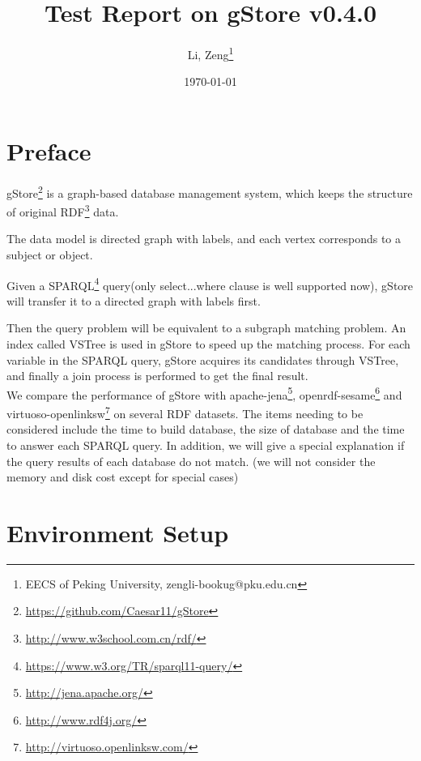 \documentclass[titlepage, a4paper, 12pt] {article}
\begin{document}
\title{\textbf{Test Report on gStore v0.4.0}}
\author{Li, Zeng\footnote{EECS of Peking University, zengli-bookug@pku.edu.cn}}
\date{\today}
\maketitle

\setcounter{tocdepth}{3}
\tableofcontents
\clearpage

\section{Preface}

gStore\footnote{\href{https://github.com/Caesar11/gStore}{https://github.com/Caesar11/gStore}} is a graph-based database management system, which keeps the structure of original RDF\footnote{\href{http://www.w3school.com.cn/rdf/}{http://www.w3school.com.cn/rdf/}} data. 

The data model is directed graph with labels, and each vertex corresponds to a subject or object. 

Given a SPARQL\footnote{\href{https://www.w3.org/TR/sparql11-query/}{https://www.w3.org/TR/sparql11-query/}} query(only select...where clause is well supported now), gStore will transfer it to a directed graph with labels first.

Then the query problem will be equivalent to a subgraph matching problem.
An index called VSTree is used in gStore to speed up the matching process. For each variable in the SPARQL query, gStore acquires its candidates through VSTree, and finally a join process is performed to get the final result.  \\

We compare the performance of gStore with apache-jena\footnote{\href{http://jena.apache.org/}{http://jena.apache.org/}}, openrdf-sesame\footnote{\href{http://www.rdf4j.org/}{http://www.rdf4j.org/}} and virtuoso-openlinksw\footnote{\href{http://virtuoso.openlinksw.com/}{http://virtuoso.openlinksw.com/}} on several RDF datasets.
The items needing to be considered include the time to build database, the size of database and the time to answer each SPARQL query.
In addition, we will give a special explanation if the query results of each database do not match.
(we will not consider the memory and disk cost except for special cases) \\

\clearpage

\section{Environment Setup}
\end{document}
